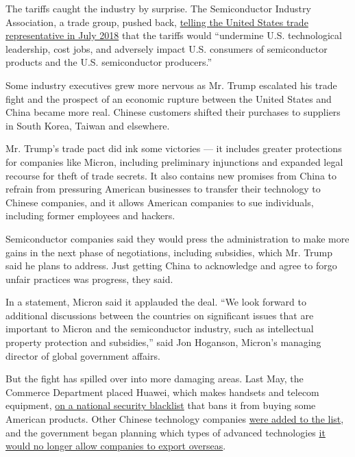 The tariffs caught the industry by surprise. The Semiconductor Industry
Association, a trade group, pushed back,
\href{https://www.semiconductors.org/wp-content/uploads/2018/08/Final-_SIA_Submission_on_301_Tariffs.pdf}{telling
the United States trade representative in July 2018} that the tariffs
would ``undermine U.S. technological leadership, cost jobs, and
adversely impact U.S. consumers of semiconductor products and the U.S.
semiconductor producers.''

Some industry executives grew more nervous as Mr. Trump escalated his
trade fight and the prospect of an economic rupture between the United
States and China became more real. Chinese customers shifted their
purchases to suppliers in South Korea, Taiwan and elsewhere.

Mr. Trump's trade pact did ink some victories --- it includes greater
protections for companies like Micron, including preliminary injunctions
and expanded legal recourse for theft of trade secrets. It also contains
new promises from China to refrain from pressuring American businesses
to transfer their technology to Chinese companies, and it allows
American companies to sue individuals, including former employees and
hackers.

Semiconductor companies said they would press the administration to make
more gains in the next phase of negotiations, including subsidies, which
Mr. Trump said he plans to address. Just getting China to acknowledge
and agree to forgo unfair practices was progress, they said.

In a statement, Micron said it applauded the deal. ``We look forward to
additional discussions between the countries on significant issues that
are important to Micron and the semiconductor industry, such as
intellectual property protection and subsidies,'' said Jon Hoganson,
Micron's managing director of global government affairs.

But the fight has spilled over into more damaging areas. Last May, the
Commerce Department placed Huawei, which makes handsets and telecom
equipment,
\href{https://www.nytimes.com/2019/05/16/technology/huawei-ban-president-trump.html}{on
a national security blacklist} that bans it from buying some American
products. Other Chinese technology companies
\href{https://www.nytimes.com/2019/10/07/us/politics/us-to-blacklist-28-chinese-entities-over-abuses-in-xinjiang.html}{were
added to the list}, and the government began planning which types of
advanced technologies
\href{https://www.nytimes.com/2019/10/23/business/trump-technology-china-trade.html}{it
would no longer allow companies to export overseas}.

